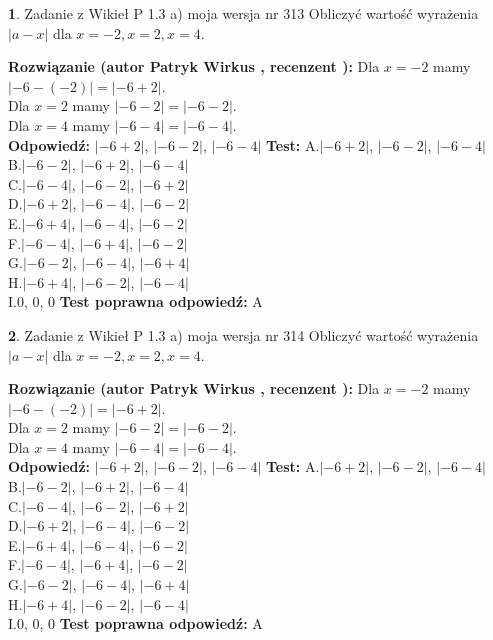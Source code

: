 \documentclass[12pt, a4paper]{article}
\theoremstyle{definition} %
\newtheorem{zad}{}
\newcommand{\zadStart}[1]{\begin{zad}#1\newline}
\newcommand{\zadStop}{\end{zad}}
\newcommand{\rozwStart}[2]{\noindent \textbf{Rozwiązanie (autor #1 , recenzent #2): }\newline}
\newcommand{\rozwStop}{\newline}
\newcommand{\odpStart}{\noindent \textbf{Odpowiedź:}\newline}
\newcommand{\odpStop}{\newline}
\newcommand{\testStart}{\noindent \textbf{Test:}\newline}
\newcommand{\testStop}{\newline}
\newcommand{\kluczStart}{\noindent \textbf{Test poprawna odpowiedź:}\newline}
\newcommand{\kluczStop}{\newline}
\begin{document}
\zadStart{Zadanie z Wikieł P 1.3 a) moja wersja nr 313}
Obliczyć wartość wyrażenia $|a - x|$ dla $x=-2,x=2,x=4$.
\zadStop
\rozwStart{Patryk Wirkus}{}
Dla $x = -2$ mamy $|-6 - (-2)| = |-6 + 2|$.\\
Dla $x = 2$ mamy $|-6 - 2| = |-6 - 2|$.\\
Dla $x = 4$ mamy $|-6 - 4| = |-6 - 4|$.\\
\rozwStop
\odpStart
$|-6 + 2|$, $|-6 - 2|$, $|-6 - 4|$
\odpStop
\testStart
A.$|-6 + 2|$, $|-6 - 2|$, $|-6 - 4|$\\
B.$|-6 - 2|$, $|-6 + 2|$, $|-6 - 4|$\\
C.$|-6 - 4|$, $|-6 - 2|$, $|-6 + 2|$\\
D.$|-6 + 2|$, $|-6 - 4|$, $|-6 - 2|$\\
E.$|-6 + 4|$, $|-6 - 4|$, $|-6 - 2|$\\
F.$|-6 - 4|$, $|-6 + 4|$, $|-6 - 2|$\\
G.$|-6 - 2|$, $|-6 - 4|$, $|-6 + 4|$\\
H.$|-6 + 4|$, $|-6 - 2|$, $|-6 - 4|$\\
I.$0$, $0$, $0$
\testStop
\kluczStart
A
\kluczStop



\zadStart{Zadanie z Wikieł P 1.3 a) moja wersja nr 314}
Obliczyć wartość wyrażenia $|a - x|$ dla $x=-2,x=2,x=4$.
\zadStop
\rozwStart{Patryk Wirkus}{}
Dla $x = -2$ mamy $|-6 - (-2)| = |-6 + 2|$.\\
Dla $x = 2$ mamy $|-6 - 2| = |-6 - 2|$.\\
Dla $x = 4$ mamy $|-6 - 4| = |-6 - 4|$.\\
\rozwStop
\odpStart
$|-6 + 2|$, $|-6 - 2|$, $|-6 - 4|$
\odpStop
\testStart
A.$|-6 + 2|$, $|-6 - 2|$, $|-6 - 4|$\\
B.$|-6 - 2|$, $|-6 + 2|$, $|-6 - 4|$\\
C.$|-6 - 4|$, $|-6 - 2|$, $|-6 + 2|$\\
D.$|-6 + 2|$, $|-6 - 4|$, $|-6 - 2|$\\
E.$|-6 + 4|$, $|-6 - 4|$, $|-6 - 2|$\\
F.$|-6 - 4|$, $|-6 + 4|$, $|-6 - 2|$\\
G.$|-6 - 2|$, $|-6 - 4|$, $|-6 + 4|$\\
H.$|-6 + 4|$, $|-6 - 2|$, $|-6 - 4|$\\
I.$0$, $0$, $0$
\testStop
\kluczStart
A
\kluczStop
\end{document}
